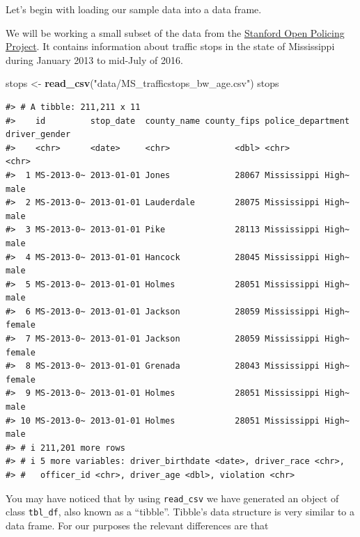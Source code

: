 \documentclass[
]{book}
\newenvironment{Shaded}{\begin{snugshade}}{\end{snugshade}}
\newcommand{\FunctionTok}[1]{\textcolor[rgb]{0.13,0.29,0.53}{\textbf{#1}}}
\newcommand{\NormalTok}[1]{#1}
\newcommand{\OtherTok}[1]{\textcolor[rgb]{0.56,0.35,0.01}{#1}}
\newcommand{\StringTok}[1]{\textcolor[rgb]{0.31,0.60,0.02}{#1}}
\begin{document}
Let's begin with loading our sample data into a data frame.

We will be working a small subset of the data from the \href{https://openpolicing.stanford.edu}{Stanford Open Policing Project}. It contains information about traffic stops in the state of Mississippi during January 2013 to mid-July of 2016.

\begin{Shaded}
\begin{Highlighting}[]
\NormalTok{stops }\OtherTok{\textless{}{-}} \FunctionTok{read\_csv}\NormalTok{(}\StringTok{"data/MS\_trafficstops\_bw\_age.csv"}\NormalTok{)}
\NormalTok{stops}
\end{Highlighting}
\end{Shaded}

\begin{verbatim}
#> # A tibble: 211,211 x 11
#>    id         stop_date  county_name county_fips police_department driver_gender
#>    <chr>      <date>     <chr>             <dbl> <chr>             <chr>        
#>  1 MS-2013-0~ 2013-01-01 Jones             28067 Mississippi High~ male         
#>  2 MS-2013-0~ 2013-01-01 Lauderdale        28075 Mississippi High~ male         
#>  3 MS-2013-0~ 2013-01-01 Pike              28113 Mississippi High~ male         
#>  4 MS-2013-0~ 2013-01-01 Hancock           28045 Mississippi High~ male         
#>  5 MS-2013-0~ 2013-01-01 Holmes            28051 Mississippi High~ male         
#>  6 MS-2013-0~ 2013-01-01 Jackson           28059 Mississippi High~ female       
#>  7 MS-2013-0~ 2013-01-01 Jackson           28059 Mississippi High~ female       
#>  8 MS-2013-0~ 2013-01-01 Grenada           28043 Mississippi High~ female       
#>  9 MS-2013-0~ 2013-01-01 Holmes            28051 Mississippi High~ male         
#> 10 MS-2013-0~ 2013-01-01 Holmes            28051 Mississippi High~ male         
#> # i 211,201 more rows
#> # i 5 more variables: driver_birthdate <date>, driver_race <chr>,
#> #   officer_id <chr>, driver_age <dbl>, violation <chr>
\end{verbatim}

You may have noticed that by using \texttt{read\_csv} we have generated an object
of class \texttt{tbl\_df}, also known as a ``tibble''. Tibble's data
structure is very similar to a data frame. For our purposes the relevant differences
are that
\end{document}

